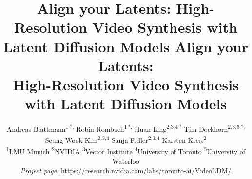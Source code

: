 \title{Align your Latents: High-Resolution Video Synthesis with Latent Diffusion Models}



\title{\vspace{-2.7em} Align your Latents: \\ High-Resolution Video Synthesis with Latent Diffusion Models}

\author{
Andreas Blattmann\textsuperscript{1\;\,*,\dag}
\quad\quad
Robin Rombach\textsuperscript{1\;\,*,\dag}
\quad\quad
Huan Ling\textsuperscript{2,3,4\;\,*}
\quad\quad
Tim Dockhorn\textsuperscript{2,3,5\;\,*,\dag}
\vspace{0.15cm}
\\
Seung Wook Kim\textsuperscript{2,3,4}
\quad\quad
Sanja Fidler\textsuperscript{2,3,4}
\quad\quad
Karsten Kreis\textsuperscript{2}
\vspace{0.25cm}
\\
{\small\textsuperscript{1}LMU Munich \quad \textsuperscript{2}NVIDIA \quad \textsuperscript{3}Vector Institute \quad \textsuperscript{4}University of Toronto \quad \textsuperscript{5}University of Waterloo \vspace{0pt}}
\vspace{0.15cm}
\\
\small \textit{Project page:} \url{https://research.nvidia.com/labs/toronto-ai/VideoLDM/}
}



